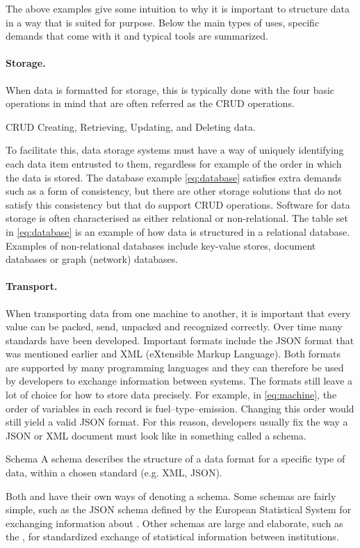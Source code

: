 The above examples give some intuition to why it is important to structure data
in a way that is suited for purpose. Below the main types of uses, specific
demands that come with it and typical tools are summarized.

\paragraph{Storage.} When data is formatted for storage, this is typically done
with the four basic operations in mind that are often referred as the CRUD
operations.
\begin{terminology}{CRUD}
Creating, Retrieving, Updating, and Deleting data.
\end{terminology}
To facilitate this, data storage systems must have a way of uniquely
identifying each data item entrusted to them, regardless for example of the
order in which the data is stored.  The database example \eqref{eq:database}
satisfies extra demands such as a form of consistency, but there are other
storage solutions that do not satisfy this consistency but that do support CRUD
operations. Software for data storage is often characterised as either
relational or non-relational. The table set in \eqref{eq:database} is an
example of how data is structured in a relational database. Examples of
non-relational databases include key-value stores, document databases or graph
(network) databases. 

\paragraph{Transport.} When transporting data from one machine to another, it
is important that every value can be packed, send, unpacked and recognized
correctly. Over time many standards have been developed. Important formats
include the JSON format that was mentioned earlier and XML (eXtensible Markup
Language). Both formats are supported by many programming languages and they
can therefore be used by developers to exchange information between systems. 
The formats still leave a lot of choice for how to store data precisely. For 
example, in \eqref{eq:machine}, the order of variables in each record is
fuel--type--emission. Changing this order would still yield a valid JSON
format. For this reason, developers usually fix the way a JSON or XML document
must look like in something called a schema.
%
\begin{terminology}{Schema}
A schema describes the structure of a data format for a
specific type of data, within a chosen standard (e.g. XML, JSON).
\end{terminology}
%
Both  and
 have their own
ways of denoting a schema. Some schemas are fairly simple, such as the JSON
schema defined by the European Statistical System for exchanging information
about
. Other schemas are large and elaborate, such as the
, for standardized exchange of
statistical information between institutions. 


